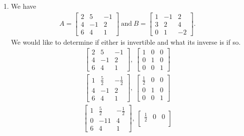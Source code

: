 \documentclass[12pt]{article}
\begin{document}
\begin{enumerate}
  \item
    We have
    \begin{align*}
      A =
      \begin{bmatrix}
        2 & 5 & -1\\
        4 & -1 & 2\\
        6 & 4 & 1
      \end{bmatrix}\ \text{and}\
      B =
      \begin{bmatrix}
        1 & -1 & 2\\
        3 & 2 & 4\\
        0 & 1 & -2
      \end{bmatrix}.
    \end{align*}
    We would like to determine if either is invertible and what
    its inverse is if so.
    \begin{align*}
      \begin{bmatrix}
        2 & 5 & -1\\
        4 & -1 & 2\\
        6 & 4 & 1
      \end{bmatrix},\
      \begin{bmatrix}
        1 & 0 & 0\\
        0 & 1 & 0\\
        0 & 0 & 1
      \end{bmatrix}
    \end{align*}
    \begin{align*}
      \begin{bmatrix}
        1 & \frac{5}{2} & -\frac{1}{2}\\
        4 & -1 & 2\\
        6 & 4 & 1
      \end{bmatrix},\
      \begin{bmatrix}
        \frac{1}{2} & 0 & 0\\
        0 & 1 & 0\\
        0 & 0 & 1
      \end{bmatrix}
    \end{align*}
    \begin{align*}
      \begin{bmatrix}
        1 & \frac{5}{2} & -\frac{1}{2}\\
        0 & -11 & 4\\
        6 & 4 & 1
      \end{bmatrix},\
      \begin{bmatrix}
        \frac{1}{2} & 0 & 0\\

\end{bmatrix}
\end{align*}
\end{enumerate}
\end{document}
